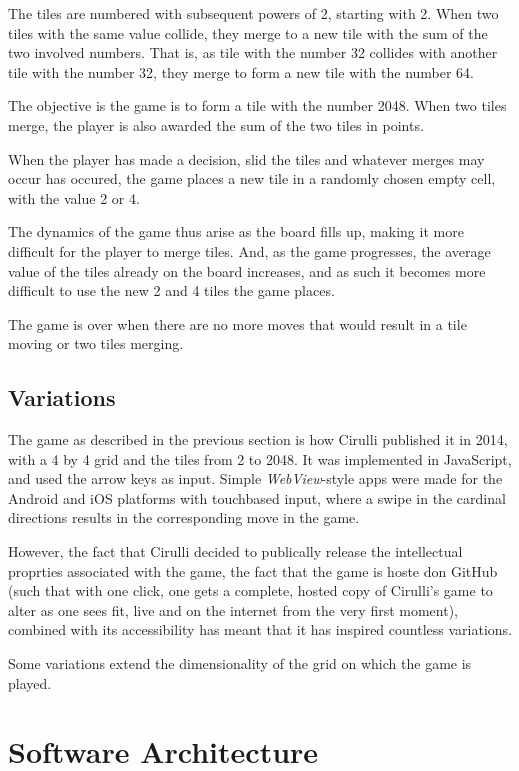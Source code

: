 \documentclass[a4paper, 12pt]{article}
\begin{document}
The tiles are numbered with subsequent powers of 2, starting with
2. When two tiles with the same value collide, they merge to a new
tile with the sum of the two involved numbers. That is, as tile with
the number 32 collides with another tile with the number 32, they
merge to form a new tile with the number 64.

The objective is the game is to form a tile with the number 2048. When
two tiles merge, the player is also awarded the sum of the two tiles
in points.

When the player has made a decision, slid the tiles and whatever
merges may occur has occured, the game places a new tile in a randomly
chosen empty cell, with the value 2 or 4.

The dynamics of the game thus arise as the board fills up, making it
more difficult for the player to merge tiles. And, as the game
progresses, the average value of the tiles already on the board
increases, and as such it becomes more difficult to use the new 2 and
4 tiles the game places.

The game is over when there are no more moves that would result in a
tile moving or two tiles merging.

\subsection{Variations}

The game as described in the previous section is how Cirulli published
it in 2014, with a 4 by 4 grid and the tiles from 2 to 2048. It was
implemented in JavaScript, and used the arrow keys as input. Simple
\emph{WebView}-style apps were made for the Android and iOS platforms
with touchbased input, where a swipe in the cardinal directions
results in the corresponding move in the game.

However, the fact that Cirulli decided to publically release the
intellectual proprties associated with the game, the fact that the
game is hoste don GitHub (such that with one click, one gets a
complete, hosted copy of Cirulli's game to alter as one sees fit, live
and on the internet from the very first moment), combined with its
accessibility has meant that it has inspired countless variations.

Some variations extend the dimensionality of the grid on which the
game is played.



\section{Software Architecture}
\end{document}
